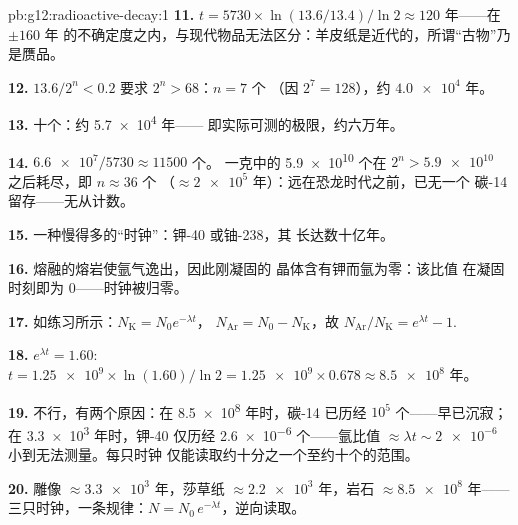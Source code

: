 \begin{solution}{pb:g12:radioactive-decay:1}
\textbf{11.} $t = \num{5730} \times \ln(13.6/13.4)/\ln 2 \approx
120$ 年——在 $\pm 160$ 年
的不确定度之内，与现代物品无法区分：羊皮纸是近代的，所谓“古物”乃是赝品。

\textbf{12.} $13.6/2^n < 0.2$ 要求 $2^n > 68$：$n = 7$ 个
（因 $2^7 = 128$），约 $\num{4.0e4}$ 年。

\textbf{13.} 十个：约 \num{5.7e4} 年——
即实际可测的极限，约六万年。

\textbf{14.} $\num{6.6e7}/\num{5730} \approx \num{11500}$ 个。
一克中的 \num{5.9e10} 个在
$2^n > \num{5.9e10}$ 之后耗尽，即 $n \approx 36$ 个
（$\approx \num{2e5}$ 年）：远在恐龙时代之前，已无一个
碳-14 留存——无从计数。

\textbf{15.} 一种慢得多的“时钟”：钾-40 或铀-238，其
长达数十亿年。

\textbf{16.} 熔融的熔岩使氩气逸出，因此刚凝固的
晶体含有钾而氩为零：该比值
在凝固时刻即为 $0$——时钟被归零。

\textbf{17.} 如练习所示：$N_{\mathrm K} = N_0 e^{-\lambda t}$，
$N_{\mathrm{Ar}} = N_0 - N_{\mathrm K}$，故
$N_{\mathrm{Ar}}/N_{\mathrm K} = e^{\lambda t} - 1$.

\textbf{18.} $e^{\lambda t} = 1.60$:
$t = \num{1.25e9} \times \ln(1.60)/\ln 2 = \num{1.25e9} \times 0.678
\approx \num{8.5e8}$ 年。

\textbf{19.} 不行，有两个原因：在 \num{8.5e8} 年时，碳-14 已历经
$10^5$ 个——早已沉寂；在 \num{3.3e3} 年时，钾-40 仅历经
\num{2.6e-6} 个——氩比值
$\approx \lambda t \sim \num{2e-6}$ 小到无法测量。每只时钟
仅能读取约十分之一个至约十个的范围。

\textbf{20.} 雕像 $\approx \num{3.3e3}$ 年，莎草纸
$\approx \num{2.2e3}$ 年，岩石 $\approx \num{8.5e8}$ 年——
三只时钟，一条规律：$N = N_0\,e^{-\lambda t}$，逆向读取。
\end{solution}
